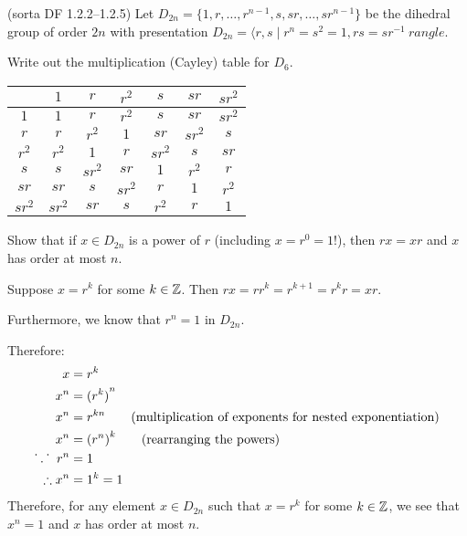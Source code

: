 \begin{problem}{\textsf{(sorta DF 1.2.2--1.2.5)}}
  Let $D_{2n}=\{1,r,\dots,r^{n-1},s,sr,\dots,sr^{n-1}\}$ be the dihedral group of 
  order $2n$ with presentation $D_{2n}=\langle r,s \mid r^n=s^2=1, rs=sr^{-1} \
  rangle$.
  \begin{enumalph}
  \item Write out the multiplication (Cayley) table for $D_6$.
  \begin{Answer}
    \begin{center}
      \begin{tabular}{ |c||c|c|c|c|c|c|| } 
       \hline
        & $1$ & $r$ & $r^2$ & $s$ & $sr$ & $sr^2$\\
       \hline
       \hline
        $1$ & $1$ & $r$ & $r^2$ & $s$ & $sr$ & $sr^2$\\
        \hline
        $r$ & $r$ & $r^2$ & $1$ & $sr$ & $sr^2$ & $s$\\
        \hline
        $r^2$ & $r^2$ & $1$ & $r$ & $sr^2$ & $s$ & $sr$\\
        \hline{}
        $s$ & $s$ & $sr^2$ & $sr$ & $1$ & $r^2$ & $r$\\
        \hline{}
        $sr$ & $sr$ & $s$ & $sr^2$ & $r$ & $1$ & $r^2$\\
        \hline
        $sr^2$ & $sr^2$ & $sr$ & $s$ & $r^2$ & $r$ & $1$\\
       \hline
      \end{tabular}
      \end{center}
  \end{Answer}
  \item Show that if $x \in D_{2n}$ is a power of $r$ (including $x=r^0=1$!), then 
  $rx=xr$ and $x$ has order at most $n$.
  \begin{Answer}
    Suppose $x = r^k$ for some $k \in \mathbb{Z}$.  Then $rx = rr^{k} = r^{k+1} = r^{k}r = xr$.

    \noindent
    Furthermore, we know that $r^{n} = 1$ in $D_{2n}$.

    Therefore:
    \begin{align*}
      x &= r^k \\
      x^{n} &= {(r^{k})}^{n} \\
      x^{n} &= r^{kn} \qquad \text{(multiplication of exponents for nested exponentiation)}\\
      x^{n} &= {(r^{n})}^{k} \qquad \text{(rearranging the powers)}\\
      \dot{}\hspace{.045in}.\hspace{.045in} \dot{}\hspace{.095in} r^{{n}} &= 1\\
      \therefore x^{n} &= 1^k = 1
    \end{align*}
    Therefore, for any element $x \in D_{2n}$ such that $x = r^k$ for some $k \in \mathbb{Z}$,
    we see that $x^{n} = 1$ and $x$ has order at most $n$.
    

\end{Answer}
\end{enumalph}
\end{problem}
